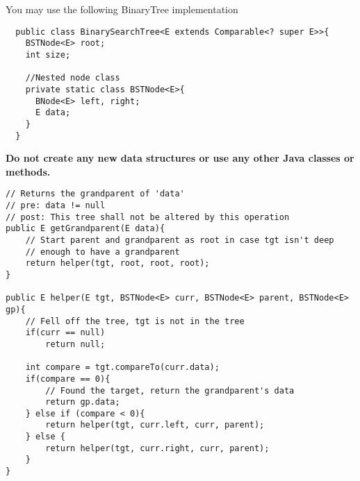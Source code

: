 \documentclass[12pt,letter]{article}
\begin{document}
\vspace{4pt}
\noindent You may use the following BinaryTree implementation

\begin{verbatim}
  public class BinarySearchTree<E extends Comparable<? super E>>{
    BSTNode<E> root;
    int size;

    //Nested node class
    private static class BSTNode<E>{
      BNode<E> left, right;
      E data;
    }
  }
\end{verbatim}

\noindent \textbf{Do not create any new data structures or use any other Java classes or methods.}

\clearpage
\begin{verbatim}
// Returns the grandparent of 'data'
// pre: data != null
// post: This tree shall not be altered by this operation
public E getGrandparent(E data){
    // Start parent and grandparent as root in case tgt isn't deep
    // enough to have a grandparent
    return helper(tgt, root, root, root);
}

public E helper(E tgt, BSTNode<E> curr, BSTNode<E> parent, BSTNode<E> gp){
    // Fell off the tree, tgt is not in the tree
    if(curr == null)
        return null;

    int compare = tgt.compareTo(curr.data);
    if(compare == 0){
        // Found the target, return the grandparent's data
        return gp.data;
    } else if (compare < 0){
        return helper(tgt, curr.left, curr, parent);
    } else {
        return helper(tgt, curr.right, curr, parent);
    }
}
\end{verbatim}
\end{document}
